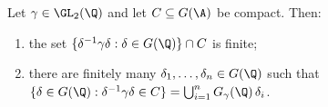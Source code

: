 Let $\gamma\in\GL_2(\Q)$ and let $C\subseteq G(\A)$ be compact. Then:
\begin{enumerate}
  \item[(a)] the set $\{\delta^{-1}\gamma\delta:\delta\in G(\Q)\}\cap C$ is finite;
  \item[(b)] there are finitely many $\delta_1,\dots,\delta_n\in G(\Q)$ such that
  $\{\delta\in G(\Q):\delta^{-1}\gamma\delta\in C\}=\bigcup_{i=1}^nG_\gamma(\Q)\,\delta_i$.
\end{enumerate}
